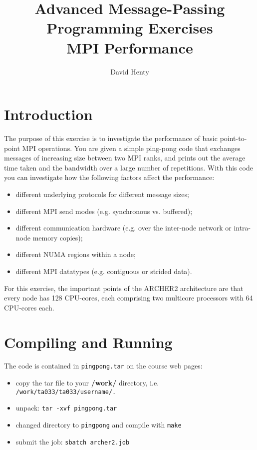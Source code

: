 \documentclass{article}
\begin{document}
\title{Advanced Message-Passing Programming Exercises \\
	MPI Performance}

\author{David Henty}
\date{}
\makeEPCCtitle

\section{Introduction}

The purpose of this exercise is to investigate the performance of
basic point-to-point MPI operations. You are given a simple ping-pong
code that exchanges messages of increasing size between two MPI ranks,
and prints out the average time taken and the bandwidth over a large
number of repetitions. With this code you can investigate how the
following factors affect the performance:

\begin{itemize}

\item different underlying protocols for different message sizes;
\item different MPI send modes (e.g. synchronous vs. buffered);
\item different communication hardware (e.g. over the inter-node network or
  intra-node memory copies);
\item different NUMA regions within a node;
\item different MPI datatypes (e.g. contiguous or strided data).

\end{itemize}

For this exercise, the important points of the ARCHER2 architecture are
that every node has 128 CPU-cores, each comprising two multicore processors
with 64 CPU-cores each.

\section{Compiling and Running}

The code is contained in \verb+pingpong.tar+ on the course web
pages:

\begin{itemize}

  \item copy the tar file to your {\bf /work/} directory,
    i.e. \verb+/work/ta033/ta033/username/.+

  \item unpack: \verb+tar -xvf pingpong.tar+

  \item changed directory to \verb+pingpong+ and compile with \verb+make+

  \item submit the job: \verb+sbatch archer2.job+

\end{itemize}
\end{document}
